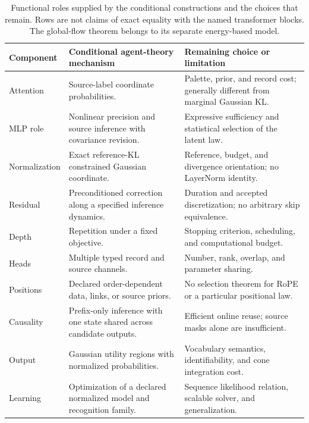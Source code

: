 \documentclass[11pt]{article}
\begin{document}
\begin{table}[tbp]
\centering
\small
\renewcommand{\arraystretch}{1.15}
\begin{tabularx}{\textwidth}{@{}>{\raggedright\arraybackslash}p{}>{\raggedright\arraybackslash}X>{\raggedright\arraybackslash}X@{}}
\toprule
Component & Conditional agent-theory mechanism & Remaining choice or limitation \\
\midrule
Attention & Source-label coordinate probabilities. & Palette, prior, and record cost; generally different from marginal Gaussian KL. \\
MLP role & Nonlinear precision and source inference with covariance revision. & Expressive sufficiency and statistical selection of the latent law. \\
Normalization & Exact reference-KL constrained Gaussian coordinate. & Reference, budget, and divergence orientation; no LayerNorm identity. \\
Residual & Preconditioned correction along a specified inference dynamics. & Duration and accepted discretization; no arbitrary skip equivalence. \\
Depth & Repetition under a fixed objective. & Stopping criterion, scheduling, and computational budget. \\
Heads & Multiple typed record and source channels. & Number, rank, overlap, and parameter sharing. \\
Positions & Declared order-dependent data, links, or source priors. & No selection theorem for RoPE or a particular positional law. \\
Causality & Prefix-only inference with one state shared across candidate outputs. & Efficient online reuse; source masks alone are insufficient. \\
Output & Gaussian utility regions with normalized probabilities. & Vocabulary semantics, identifiability, and cone integration cost. \\
Learning & Optimization of a declared normalized model and recognition family. & Sequence likelihood relation, scalable solver, and generalization. \\
\bottomrule
\end{tabularx}
\caption{Functional roles supplied by the conditional constructions and the choices that remain. Rows are not claims of exact equality with the named transformer blocks. The global-flow theorem belongs to its separate energy-based model.}
\label{tab:roles}
\end{table}
\end{document}
